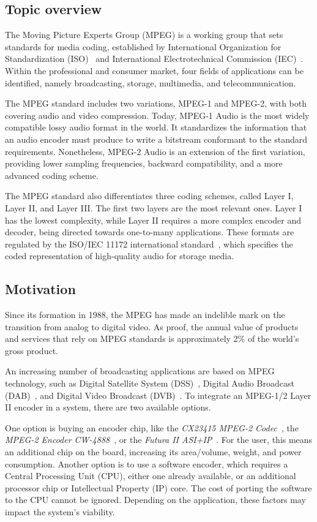 \subsection{Topic overview}

The Moving Picture Experts Group (MPEG) is a working group that sets standards for media coding, established by International Organization for Standardization (ISO)~\cite{iso} and International Electrotechnical Commission (IEC)~\cite{iec}. Within the professional and consumer market, four fields of applications can be identified, namely broadcasting, storage, multimedia, and telecommunication.

The MPEG standard includes two variations, MPEG-1 and MPEG-2, with both covering audio and video compression.  Today, MPEG-1 Audio is the most widely compatible lossy audio format in the world. It standardizes the information that an audio encoder must produce to write a bitstream conformant to the standard requirements.  Nonetheless, MPEG-2 Audio is an extension of the first variation, providing lower sampling frequencies, backward compatibility, and a more advanced coding scheme.

The MPEG standard also differentiates three coding schemes, called Layer I, Layer II, and Layer III.  The first two layers are the most relevant ones. Layer I has the lowest complexity, while Layer II requires a more complex encoder and decoder, being directed towards one-to-many applications. These formats are regulated by the ISO/IEC 11172 international standard~\cite{11172}, which specifies the coded representation of high-quality audio for storage media.

\subsection{Motivation}

Since its formation in 1988, the MPEG has made an indelible mark on the transition from analog to digital video. As proof, the annual value of products and services that rely on MPEG standards is approximately 2\% of the world's gross product.

An increasing number of broadcasting applications are based on MPEG technology, such as Digital Satellite System (DSS)~\cite{dss}, Digital Audio Broadcast (DAB)~\cite{dab}, and Digital Video Broadcast (DVB)~\cite{dvb}. To integrate an MPEG-1/2 Layer II encoder in a system, there are two available options.

One option is buying an encoder chip, like the \textit{CX23415 MPEG-2 Codec}~\cite{cx23415}, the \textit{MPEG-2 Encoder CW-4888}~\cite{cw4888}, or the \textit{Futura II ASI+IP}~\cite{futura}. For the user, this means an additional chip on the board, increasing its area/volume, weight, and power consumption. Another option is to use a software encoder, which requires a Central Processing Unit (CPU), either one already available, or an additional processor chip or Intellectual Property (IP) core. The cost of porting the software to the CPU cannot be ignored. Depending on the application, these factors may impact the system's viability.

